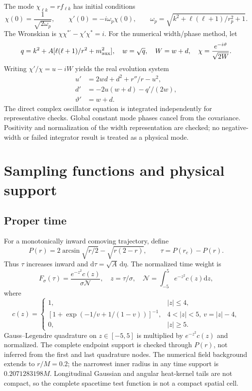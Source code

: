 \documentclass[10pt]{article}
\newcommand{\dd}{\mathrm d}
\begin{document}
The mode $\chi_{\ell k}=r f_{\ell k}$ has initial conditions
\begin{equation}
 \chi(0)=\frac{1}{\sqrt{2\omega_p}},\qquad
 \chi'(0)=-i\omega_p\chi(0),\qquad
 \omega_p=\sqrt{k^2+\ell(\ell+1)/r_p^2+1}.
\end{equation}
The Wronskian is $\chi\chi^{*\prime}-\chi'\chi^*=i$. For the numerical width/phase method, let
\begin{equation}
 q=k^2+A[\ell(\ell+1)/r^2+m_{\rm aux}^2],\quad w=\sqrt q,\quad W=w+d,
 \quad\chi=\frac{e^{-i\vartheta}}{\sqrt{2W}}.
\end{equation}
Writing $\chi'/\chi=u-iW$ yields the real evolution system
\begin{align}
 u'&=2wd+d^2+r''/r-u^2,\\
 d'&=-2u(w+d)-q'/(2w),\\
 \vartheta'&=w+d.
\end{align}
The direct complex oscillator equation is integrated independently for representative checks. Global constant mode phases cancel from the covariance. Positivity and normalization of the width representation are checked; no negative-width or failed integrator result is treated as a physical mode.

\section{Sampling functions and physical support}
\subsection{Proper time}
For a monotonically inward comoving trajectory, define
\begin{equation}
 P(r)=2\arcsin\sqrt{r/2}-\sqrt{r(2-r)},\qquad
 \tau=P(r_c)-P(r).
\end{equation}
Thus $\tau$ increases inward and $\dd\tau=\sqrt A\,\dd\eta$. The normalized time weight is
\begin{equation}
 F_\sigma(\tau)=\frac{e^{-z^2}c(z)}{\sigma\mathcal N},\quad z=\tau/\sigma,\quad
 \mathcal N=\int_{-5}^{5}e^{-z^2}c(z)\dd z,
\end{equation}
where
\begin{equation}
 c(z)=\begin{cases}1,&|z|\leq4,\\
 [1+\exp(-1/v+1/(1-v))]^{-1},&4<|z|<5,\ v=|z|-4,\\
 0,&|z|\geq5.
 \end{cases}
\end{equation}
Gauss--Legendre quadrature on $z\in[-5,5]$ is multiplied by $e^{-z^2}c(z)$ and normalized. The complete endpoint support is checked through $P(r)$, not inferred from the first and last quadrature nodes. The numerical field background extends to $r/M=0.2$; the narrowest inner radius in any time support is $0.2071283198M$. Longitudinal Gaussian and angular heat-kernel tails are not compact, so the complete spacetime test function is not a compact spatial cell.
\end{document}

